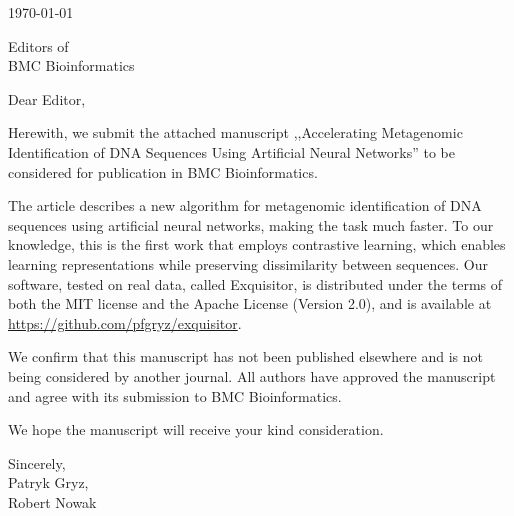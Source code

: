 \documentclass[12pt]{article}
\begin{document}
\pagestyle{empty}

\begin{flushright}
\today
\end{flushright}

\begin{flushleft}
  Editors of \\
  BMC Bioinformatics
\end{flushleft}

\vspace{5mm}
\noindent
Dear Editor,

\vspace{2mm}

Herewith, we submit the attached manuscript ,,Accelerating Metagenomic Identification of DNA Sequences Using Artificial Neural Networks'' to be considered for publication in BMC Bioinformatics.

The article describes a new algorithm for metagenomic identification of DNA sequences using artificial neural networks, making the task much faster. To our knowledge, this is the first work that employs contrastive learning, which enables learning representations while preserving dissimilarity between sequences. Our software, tested on real data, called Exquisitor,
is distributed under the terms of both the MIT license and the Apache License (Version 2.0), and is available at \url{https://github.com/pfgryz/exquisitor}.

We confirm that this manuscript has not been published elsewhere and is not being considered by another journal. All authors have approved the manuscript and agree with its submission to BMC Bioinformatics.

We hope the manuscript will receive your kind consideration.

\vspace{5mm}
\noindent
Sincerely,\\
Patryk Gryz,\\
Robert Nowak
\end{document}
